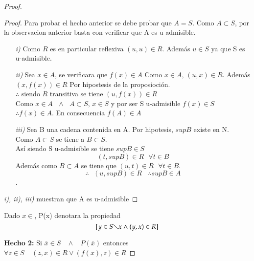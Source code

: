 \begin{proof}
\begin{proof}
  

Para probar el hecho anterior  se debe probar que  $ A = S $. \linebreak 
Como $ A \subset S $, por  la observacion anterior basta con verificar que A es u-admisible.
\begin{itemize}
\item[\textit{i)}] Como $ R $ es en particular reflexiva  $(u,u) \in R$. Además $ u \in S $ ya que S es  u-admisible.
\item[\textit{ii)}] Sea $ x \in A $, se verificara que $ f(x) \in A $
\bigskip
Como $ x \in A $,  $ (u,x) \in R $. Además $ (x,f(x)) \in  R $ Por hipostesis de la proposioción. \\

$ \therefore $  siendo $ R $ transitiva se tiene $ (u,f(x)) \in R $ \\

Como $ x \in A \ \ \ \wedge \ \ \ A \subset S $,  $ x \in S $  y por ser S u-admisible $ f(x) \in S $
$\therefore f(x) \in A $.   En consecuencia $ f(A) \in A $

\item[\textit{iii)}] Sea B una cadena contenida en A. Por hipotesis, $ supB $ existe  en N.\\
Como $ A \subset S $ se tiene a $ B \subset S $.\\
Así siendo S u-admisible se tiene $ supB \in S $\\
$$ (t,supB) \in R \ \ \ \forall t \in B $$
Además como $ B \subset A  $ se tiene  que $ (u,t) \in R \ \ \ \forall t \in B $.
$$ \therefore \ \ \ (u,supB) \in R \ \ \ \ \therefore supB \in A $$.

\end{itemize}  
\textit{i), ii), iii)} muestran que A es u-admisible  
\end{proof}
Dado $ x \in  $, P(x) denotara la propiedad $$ [y \in S \diagdown {x} \wedge (y,x) \in R] $$

\textbf{Hecho 2:}   Si   $ \overline{x} \in S \ \ \ \ \wedge \ \ \ \ P(\overline{x}) $  entonces  $ \forall
z \in S \ \ \ \ \ (z,\overline{x}) \in R \vee (f(\overline{x}),z) \in R $


\end{proof}
